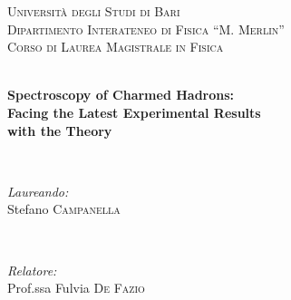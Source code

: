 \thispagestyle{empty}

\begingroup

\center %


\textsc{\LARGE Università degli Studi di Bari}\\[1.5cm]
\textsc{\Large Dipartimento Interateneo di Fisica “M. Merlin”}\\[0.5cm]
\textsc{\large Corso di Laurea Magistrale in Fisica}\\[0.5cm]


\HRule \\[0.4cm]
{ \huge 
  \bfseries Spectroscopy of Charmed Hadrons: \\ Facing the Latest Experimental Results \\ with the Theory \par
}
\HRule \\[1.5cm]


\begin{minipage}{0.4\textwidth}
\begin{flushleft} \large
\emph{Laureando:}\\
Stefano \textsc{Campanella}
\end{flushleft}
\end{minipage}
~
\begin{minipage}{0.4\textwidth}
\begin{flushright} \large
\emph{Relatore:} \\
Prof.ssa Fulvia \textsc{De Fazio}\\
\end{flushright}
\end{minipage}\\[4cm]

\null
\vfill


